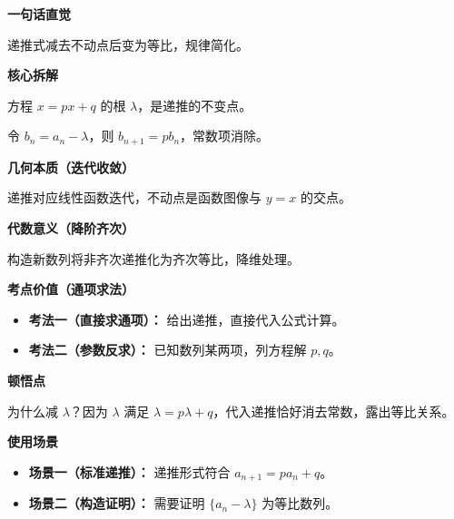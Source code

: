 \begin{explanationbox}
	\textbf{\textcolor{CExplanation}{一句话直觉}}

	递推式减去不动点后变为等比，规律简化。

	\medskip
	\textbf{\textcolor{CExplanation}{核心拆解}}
	\begin{description}[style=nextline, leftmargin=2.8em, labelsep=0.5em, itemsep=0.45em]
		\item[\textbf{要点一（不动点含义）：}] 方程 $x = p x + q$ 的根 $\lambda$，是递推的不变点。
		\item[\textbf{要点二（构造消常）：}] 令 $b_n = a_n - \lambda$，则 $b_{n+1} = p b_n$，常数项消除。
	\end{description}

	\medskip
	\textbf{\textcolor{CExplanation}{几何本质（迭代收敛）}}

	递推对应线性函数迭代，不动点是函数图像与 $y=x$ 的交点。

	\medskip
	\textbf{\textcolor{CExplanation}{代数意义（降阶齐次）}}

	构造新数列将非齐次递推化为齐次等比，降维处理。

	\medskip
	\textbf{\textcolor{CExplanation}{考点价值（通项求法）}}
	\begin{itemize}[leftmargin=*, itemsep=0.5em, topsep=0.4em]
		\item \textbf{考法一（直接求通项）：} 给出递推，直接代入公式计算。
		\item \textbf{考法二（参数反求）：} 已知数列某两项，列方程解 $p,q$。
	\end{itemize}

	\medskip
	\textbf{\textcolor{CExplanation}{顿悟点}}

	为什么减 $\lambda$？因为 $\lambda$ 满足 $\lambda = p\lambda+q$，代入递推恰好消去常数，露出等比关系。

	\medskip
	\textbf{\textcolor{CExplanation}{使用场景}}
	\begin{itemize}[leftmargin=*, itemsep=0.5em, topsep=0.4em]
		\item \textbf{场景一（标准递推）：} 递推形式符合 $a_{n+1}=p a_n+q$。
		\item \textbf{场景二（构造证明）：} 需要证明 $\{a_n-\lambda\}$ 为等比数列。
	\end{itemize}
\end{explanationbox}
